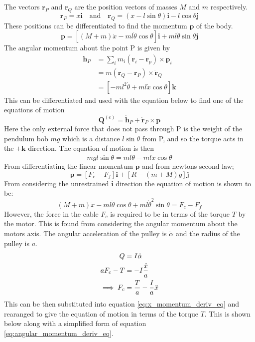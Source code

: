\documentclass{article}
\begin{document}
The vectors $\mathbf{r}_P$ and $\mathbf{r}_Q$ are the position vectors of masses $M$ and $m$ respectively.
\begin{equation}
  \mathbf{r}_P = x \mathbf{i} \quad \text{and} \quad \mathbf{r}_Q = (x-l\sin\theta) \mathbf{i} - l\cos\theta \mathbf{j}
\end{equation}
These positions can be differentiated to find the momentum $\mathbf{p}$ of the body.
\begin{equation}
  \mathbf{p} = \left[(M+m)\dot{x}-ml\dot{\theta}\cos\theta \right] \mathbf{i} + ml\dot{\theta}\sin\theta\mathbf{j}
  \label{eq:trolly_momentum}
\end{equation}
The angular momentum about the point P is given by
\begin{align}
  \mathbf{h}_P &= \sum_i m_i(\mathbf{r}_i - \mathbf{r}_p) \times \mathbf{p}_i \\
  &= m (\mathbf{r}_Q - \mathbf{r}_P) \times \dot{\mathbf{r}}_Q \\
  &= \left[ -ml^2\dot{\theta} + ml\dot{x}\cos\theta \right] \mathbf{k}
\end{align}
This can be differentiated and used with the equation below to find one of the equations of motion 
\begin{equation}
  \mathbf{Q}^{(e)} = \dot{\mathbf{h}}_P + \dot{\mathbf{r}}_P \times \mathbf{p}
\end{equation}
Here the only external force that does not pass through P is the weight of the pendulum bob $mg$ which is a distance $l\sin\theta$ from P,
and so the torque acts in the $+\mathbf{k}$ direction. The equation of motion is then
\begin{equation}
  mgl\sin\theta = ml\ddot{\theta} - ml\ddot{x}\cos\theta
  \label{eq:angular_momentum_deriv_eq}
\end{equation}
From differentiating the linear momentum $\mathbf{p}$ and from newtons second law;
\begin{equation}
  \dot{\mathbf{p}} = \left[F_c - F_f \right] \mathbf{i} + \left[ R - (m+M)g \right]\mathbf{j}
\end{equation}
From considering the unrestrained $\mathbf{i}$ direction the equation of motion is shown to be:
\begin{equation}
  (M+m)\ddot{x} - ml\ddot{\theta}\cos\theta + ml\dot{\theta}^2\sin\theta = F_c - F_f
  \label{eq:x_momentum_deriv_eq}
\end{equation}
However, the force in the cable $F_c$ is required to be in terms of the torque $T$ by the motor.
This is found from considering the angular momentum about the motors axis. The angular acceleration of the pulley is $\ddot{\alpha}$ and the radius of the pulley is $a$.
\begin{align}
  Q &= I\ddot{\alpha} \notag \\
  aF_c - T &= -I\frac{\ddot{x}}{a} \notag \\
  \implies F_c &= \frac{T}{a} - \frac{I}{a}\ddot{x}
\end{align}
This can be then substituted into equation \ref{eq:x_momentum_deriv_eq} and rearanged to give the equation of motion in terms of the torque $T$.
This is shown below along with a simplified form of equation \ref{eq:angular_momentum_deriv_eq}.
\end{document}
